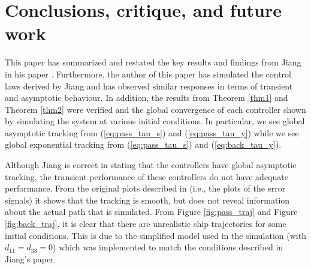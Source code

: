 \documentclass[amsthm, twocolumn]{autart}
\begin{document}
{\section{Conclusions, critique, and future work}
%
This paper has summarized and restated the key results and findings from Jiang in his paper \cite{Jiang02}. Furthermore, the author of this paper has simulated the control laws derived by Jiang and has observed similar responses in terms of transient and asymptotic behaviour. In addition, the results from Theorem \ref{thm1} and Theorem \ref{thm2} were verified and the global convergence of each controller shown by simulating the system at various initial conditions. In particular, we see global asymptotic tracking from (\ref{eq:pass_tau_s}) and (\ref{eq:pass_tau_y}) while we see global exponential tracking from (\ref{eq:pass_tau_s}) and (\ref{eq:back_tau_y}).

Although Jiang is correct in stating that the controllers have global asymptotic tracking, the transient performance of these controllers do not have adequate performance. From the original plots described in \cite{Jiang02} (i.e., the plots of the error signals) it shows that the tracking is smooth, but does not reveal information about the actual path that is simulated. From Figure \ref{fig:pass_traj} and Figure \ref{fig:back_traj}, it is clear that there are unrealistic ship trajectories for some initial conditions. This is due to the simplified model used in the simulation (with $d_{11}=d_{33}=0$) which was implemented to match the conditions described in Jiang's paper. 

}
\end{document}
